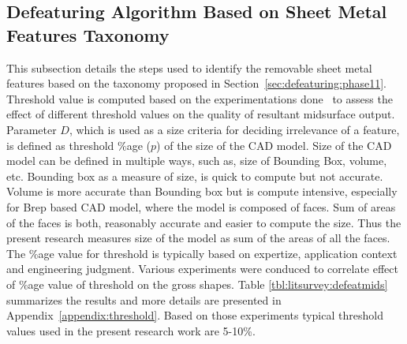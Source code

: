 \subsection{Defeaturing Algorithm Based on Sheet Metal Features \mbox{Taxonomy}} \label{sec:defeaturing:taxonomy}

This subsection details the steps used to identify the removable sheet metal features based on the taxonomy proposed in Section~\ref{sec:defeaturing:phase11}. 
Threshold value is computed based on the experimentations done~\cite{YogeshCADandA2016} to assess the effect of different threshold values on the quality of resultant midsurface output. Parameter $D$, which is used as a size criteria for deciding irrelevance of a feature, is defined as threshold \%age ($p$) of the size of the CAD model. Size of the CAD model can be defined in multiple ways, such as, size of Bounding Box, volume, etc. Bounding box as a measure of size, is quick to compute but not accurate. Volume is more accurate than Bounding box but is compute intensive, especially for Brep based CAD model, where the model is composed of faces. Sum of areas of the faces is both, reasonably accurate and easier to compute the size. Thus the present research measures size of the model as sum of the areas of all the faces. The \%age value for threshold is typically based on expertize, application context and engineering judgment. Various experiments were conduced to correlate effect of \%age value of threshold on the gross shapes. Table \ref{tbl:litsurvey:defeatmids} summarizes the results and more details are presented in Appendix~\ref{appendix:threshold}. Based on those experiments typical threshold values used in the present research work are 5-10\%.

